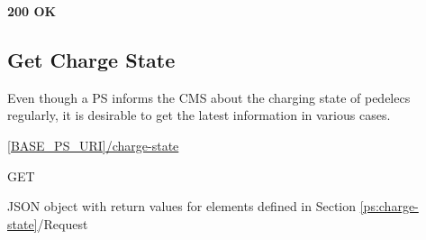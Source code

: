 
 \textbf{200 OK}


\subsection{Get Charge State}

Even though a \acs{PS} informs the \acs{CMS} about the charging state of pedelecs regularly, it is desirable to get the latest information in various cases.

 \url{[BASE_PS_URI]/charge-state}

 GET


 JSON object with return values for elements defined in Section \ref{ps:charge-state}/Request

